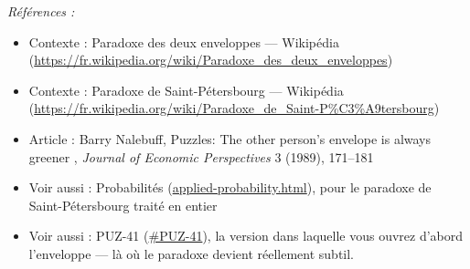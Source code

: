 \documentclass[11pt]{article}
\newenvironment{refs}{\par\small\noindent\emph{Références :}\begin{itemize}\setlength\itemsep{0pt}}{\end{itemize}\normalsize}
\begin{document}
\begin{refs}
\item Contexte : Paradoxe des deux enveloppes --- Wikipédia (\url{https://fr.wikipedia.org/wiki/Paradoxe_des_deux_enveloppes})
\item Contexte : Paradoxe de Saint-Pétersbourg --- Wikipédia (\url{https://fr.wikipedia.org/wiki/Paradoxe_de_Saint-P%C3%A9tersbourg})
\item Article : Barry Nalebuff, \og{} Puzzles: The other person's envelope is always greener \fg{}, \textit{Journal of Economic Perspectives} 3 (1989), 171--181
\item Voir aussi : Probabilités (\url{applied-probability.html}), pour le paradoxe de Saint-Pétersbourg traité en entier
\item Voir aussi : PUZ-41 (\url{#PUZ-41}), la version dans laquelle vous ouvrez d'abord l'enveloppe --- là où le paradoxe devient réellement subtil.
\end{refs}

\bigskip
\end{document}
